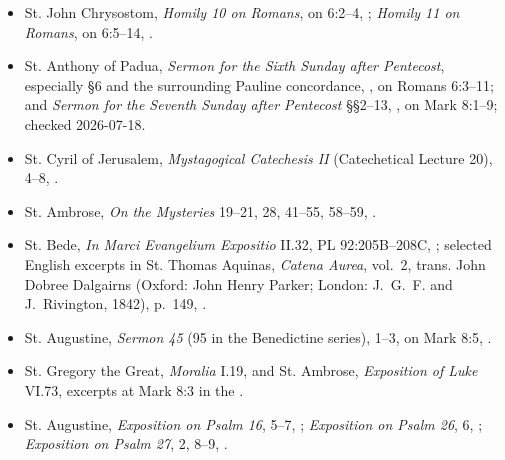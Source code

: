 \begin{deepstudy}
{\begin{itemize}[itemsep=0em,topsep=0.15em,parsep=0pt]
\item St. John Chrysostom, \emph{Homily 10 on Romans}, on 6:2--4, ; \emph{Homily 11 on Romans}, on 6:5--14, .
\item St. Anthony of Padua, \emph{Sermon for the Sixth Sunday after Pentecost}, especially §6 and the surrounding Pauline concordance, , on Romans 6:3--11; and \emph{Sermon for the Seventh Sunday after Pentecost} §§2--13, , on Mark 8:1--9; checked 2026-07-18.
\item St. Cyril of Jerusalem, \emph{Mystagogical Catechesis II} (Catechetical Lecture 20), 4--8, .
\item St. Ambrose, \emph{On the Mysteries} 19--21, 28, 41--55, 58--59, .
\item St. Bede, \emph{In Marci Evangelium Expositio} II.32, PL 92:205B--208C, ; selected English excerpts in St. Thomas Aquinas, \emph{Catena Aurea}, vol.~2, trans. John Dobree Dalgairns (Oxford: John Henry Parker; London: J.~G.~F. and J.~Rivington, 1842), p.~149, .
\item St. Augustine, \emph{Sermon 45} (95 in the Benedictine series), 1--3, on Mark 8:5, .
\item St. Gregory the Great, \emph{Moralia} I.19, and St. Ambrose, \emph{Exposition of Luke} VI.73, excerpts at Mark 8:3 in the .
\item St. Augustine, \emph{Exposition on Psalm 16}, 5--7, ; \emph{Exposition on Psalm 26}, 6, ; \emph{Exposition on Psalm 27}, 2, 8--9, .

\end{itemize}}
\end{deepstudy}
